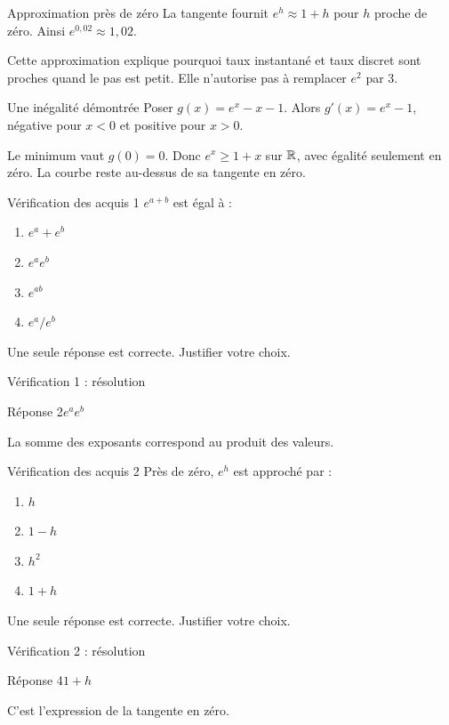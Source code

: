 \documentclass[aspectratio=169,12pt]{beamer}
\begin{document}
\renewcommand{\slidekind}{COMPRENDRE}
\begin{frame}[t,fragile]{Approximation près de zéro}
La tangente fournit $e^h\approx1+h$ pour $h$ proche de zéro. Ainsi $e^{0,02}\approx1,02$.\medskip\par Cette approximation explique pourquoi taux instantané et taux discret sont proches quand le pas est petit. Elle n’autorise pas à remplacer $e^2$ par $3$.
\end{frame}
\renewcommand{\slidekind}{COMPRENDRE}
\begin{frame}[t,fragile]{Une inégalité démontrée}
Poser $g(x)=e^x-x-1$. Alors $g\prime(x)=e^x-1$, négative pour $x<0$ et positive pour $x>0$.\medskip\par Le minimum vaut $g(0)=0$. Donc $e^x\ge1+x$ sur $\mathbb{R}$, avec égalité seulement en zéro. La courbe reste au-dessus de sa tangente en zéro.
\end{frame}
\renewcommand{\slidekind}{À VOUS DE JOUER}\begin{frame}[t]{Vérification des acquis 1}
$e^{a+b}$ est égal à :\begin{enumerate}
\item $e^a+e^b$
\item $e^ae^b$
\item $e^{ab}$
\item $e^a/e^b$
\end{enumerate}\medskip Une seule réponse est correcte. Justifier votre choix.\end{frame}
\renewcommand{\slidekind}{COMPRENDRE LA RÉPONSE}\begin{frame}[t]{Vérification 1 : résolution}
\begin{block}{Réponse 2}$e^ae^b$\end{block}\medskip La somme des exposants correspond au produit des valeurs.\end{frame}
\renewcommand{\slidekind}{À VOUS DE JOUER}\begin{frame}[t]{Vérification des acquis 2}
Près de zéro, $e^h$ est approché par :\begin{enumerate}
\item $h$
\item $1-h$
\item $h^2$
\item $1+h$
\end{enumerate}\medskip Une seule réponse est correcte. Justifier votre choix.\end{frame}
\renewcommand{\slidekind}{COMPRENDRE LA RÉPONSE}\begin{frame}[t]{Vérification 2 : résolution}
\begin{block}{Réponse 4}$1+h$\end{block}\medskip C’est l’expression de la tangente en zéro.\end{frame}
\end{document}
